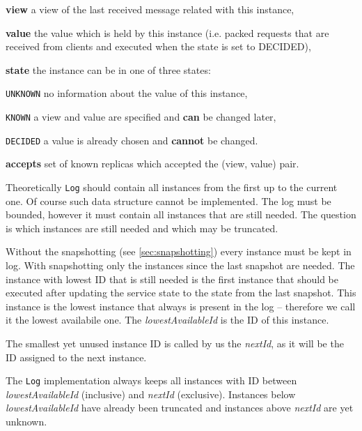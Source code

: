 \begin{tightList}[\setlength{\itemindent}{0pt}\setlength{\leftmargin}{2\leftmargin}]
  \item[\textbf{view}] a view of the last received message related with this instance,
  \item[\textbf{value}] the value which is held by this instance (i.e. packed requests that are received from clients and executed when the state is set to DECIDED), 
  \item[\textbf{state}] the instance can be in one of three states:
  \begin{tightList}[\setlength{\itemindent}{0pt} \setlength{\labelwidth}{7em}]
    \item[\texttt{\tiny UNKNOWN}] no information about the value of this instance,
    \item[\texttt{\tiny KNOWN}] a view and value are specified and \textbf{can} be changed later,
    \item[\texttt{\tiny DECIDED}] a value is already chosen and \textbf{cannot} be changed.
  \end{tightList}
  \item[\textbf{accepts}] set of known replicas which accepted the (view, value) pair.
\end{tightList}

Theoretically \texttt{Log} should contain all instances from the first up to the current one.
Of course such data structure cannot be implemented. The log must be bounded, however it must contain all instances that are still needed. The question is which instances are still needed and which may be truncated.

Without the snapshotting (see \ref{sec:snapshotting}) every instance must be kept in log. With snapshotting only the instances since the last snapshot are needed. The instance with lowest ID that is still needed is the first instance that should be executed after updating the service state to the state from the last snapshot. This instance is the lowest instance that always is present in the log -- therefore we call it the lowest availabile one. The \textit{lowestAvailableId} is the ID of this instance.

The smallest yet unused instance ID is called by us the \textit{nextId}, as it will be the ID assigned to the next instance.

The \texttt{Log} implementation always keeps all instances with ID between \textit{lowestAvailableId} (inclusive) and \textit{nextId} (exclusive). Instances below \textit{lowestAvailableId} have already been truncated and instances above \textit{nextId} are yet unknown.

